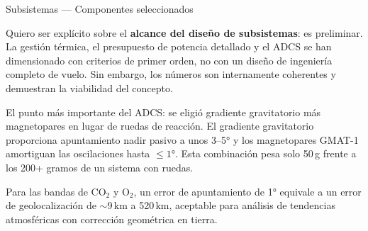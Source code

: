 \documentclass[10pt, aspectratio=169]{beamer}
\begin{document}
\begin{frame}{Subsistemas — Componentes seleccionados}
{    \medskip
    Quiero ser explícito sobre el \textbf{alcance del diseño de subsistemas}: es preliminar.
    La gestión térmica, el presupuesto de potencia detallado y el ADCS se han dimensionado
    con criterios de primer orden, no con un diseño de ingeniería completo de vuelo. Sin
    embargo, los números son internamente coherentes y demuestran la viabilidad del concepto.

    \medskip
    El punto más importante del ADCS: se eligió gradiente gravitatorio más magnetopares en
    lugar de ruedas de reacción. El gradiente gravitatorio proporciona apuntamiento nadir
    pasivo a unos 3--5° y los magnetopares GMAT-1 amortiguan las oscilaciones hasta $\leq 1°$.
    Esta combinación pesa solo 50\,g frente a los 200+ gramos de un sistema con ruedas.

    \medskip
    Para las bandas de CO$_2$ y O$_2$, un error de apuntamiento de 1° equivale a un error
    de geolocalización de $\sim$9\,km a 520\,km, aceptable para análisis de tendencias
    atmosféricas con corrección geométrica en tierra.
  }
\end{frame}
\end{document}
